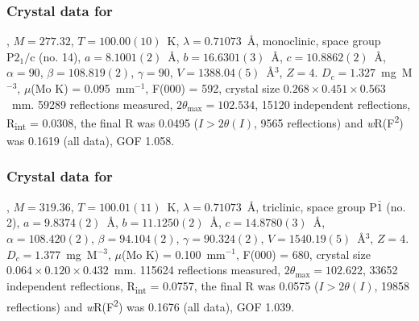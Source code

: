 \begin{refsection}
\subsubsection{Crystal data for \texorpdfstring{}{C14 H19 N3 O3}}
, $M=277.32$, $T=100.00(10)$~K, $\lambda=0.71073$~\AA, monoclinic, space group $\text{P}2_1/\text{c}$ (no. 14), $a = 8.1001(2)$~\AA, $b = 16.6301(3)$~\AA, $c = 10.8862(2)$~\AA, $\alpha = 90$\degree, $\beta = 108.819(2)$\degree, $\gamma = 90$\degree, $V = 1388.04(5)$~\AA$^{3}$, $Z = 4$. $D_{c}= 1.327$~mg~M$^{-3}$, $\mu$(Mo K\a) = 0.095~mm$^{-1}$, F(000) = 592, crystal size $0.268 \times 0.451 \times 0.563$~mm. 59289 reflections measured, $2\theta_{\max}=102.534$\degree, 15120 independent reflections, R\textsubscript{int} = 0.0308, the final R was 0.0495 ($I > 2\theta(I)$, 9565 reflections) and \emph{w}R(F\textsuperscript{2}) was 0.1619 (all data), GOF 1.058. 

\subsubsection{Crystal data for \texorpdfstring{}{C16 H21 N3 O4}}
, $M=319.36$, $T=100.01(11)$~K, $\lambda=0.71073$~\AA, triclinic, space group $\text{P}\bar{1}$ (no. 2), $a = 9.8374(2)$~\AA, $b = 11.1250(2)$~\AA, $c = 14.8780(3)$~\AA, $\alpha = 108.420(2)$\degree, $\beta = 94.104(2)$\degree, $\gamma = 90.324(2)$\degree, $V = 1540.19(5)$~\AA$^{3}$, $Z = 4$. $D_{c}= 1.377$~mg~M$^{-3}$, $\mu$(Mo K\a) = 0.100~mm$^{-1}$, F(000) = 680, crystal size $0.064 \times 0.120 \times 0.432$~mm. 115624 reflections measured, $2\theta_{\max}=102.622$\degree, 33652 independent reflections, R\textsubscript{int} = 0.0757, the final R was 0.0575 ($I > 2\theta(I)$, 19858 reflections) and \emph{w}R(F\textsuperscript{2}) was 0.1676 (all data), GOF 1.039. 
\printbibliography[heading=subbibliography]
\end{refsection}
